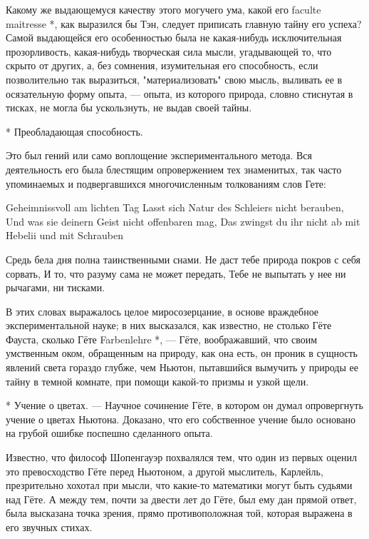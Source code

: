 Какому же выдающемуся  качеству этого могучего ума,  какой его faculte
maitresse *,  как выразился  бы Тэн,  следует приписать  главную тайну
его  успеха? Самой  выдающейся его  особенностью была  не какая-нибудь
исключительная  прозорливость,  какая-нибудь  творческая  сила  мысли,
угадывающей то,  что скрыто от  других, а, без  сомнения, изумительная
его способность, если  позволительно так выразиться, "материализовать"
свою  мысль, выливать  ее в  осязательную форму  опыта, ---  опыта, из
которого природа, словно стиснутая в  тисках, не могла бы ускользнуть,
не выдав своей тайны.

* Преобладающая способность.

Это  был  гений или  само  воплощение  экспериментального метода.  Вся
деятельность  его была  блестящим  опровержением  тех знаменитых,  так
часто  упоминаемых и  подвергавшихся  многочисленным толкованиям  слов
Гете:


Geheimnissvoll am  lichten Tag  Lasst sich  Natur des  Schleiers nicht
berauben, Und was sie deinern  Geist nicht offenbaren mag, Das zwingst
du ihr nicht ab mit Hebelii und mit Schrauben

Средь бела дня полна таинственными  снами. Не даст тебе природа покров
с  себя сорвать,  И то,  что разуму  сама не  может передать,  Тебе не
выпытать у нее ни рычагами, ни тисками.

В  этих словах  выражалось целое  миросозерцание, в  основе враждебное
экспериментальной науке;  в них  высказался, как известно,  не столько
Гёте Фауста, сколько  Гёте Farbenlehre *, ---  Гёте, воображавший, что
своим умственным оком, обращенным на  природу, как она есть, он проник
в  сущность  явлений  света  гораздо глубже,  чем  Ньютон,  пытавшийся
вымучить  у природы  ее тайну  в темной  комнате, при  помощи какой-то
призмы и узкой щели.

* Учение  о цветах.  --- Научное  сочинение Гёте,  в котором  он думал
опровергнуть учение  о цветах  Ньютона. Доказано, что  его собственное
учение было основано на грубой ошибке поспешно сделанного опыта.

Известно, что  философ Шопенгауэр похвалялся  тем, что один  из первых
оценил  это превосходство  Гёте  перед Ньютоном,  а другой  мыслитель,
Карлейль,  презрительно хохотал  при  мысли,  что какие-то  математики
могут  быть судьями  над Гёте.  А между  тем, почти  за двести  лет до
Гёте, был  ему дан  прямой ответ, была  высказана точка  зрения, прямо
противоположная той, которая выражена в его звучных стихах.

